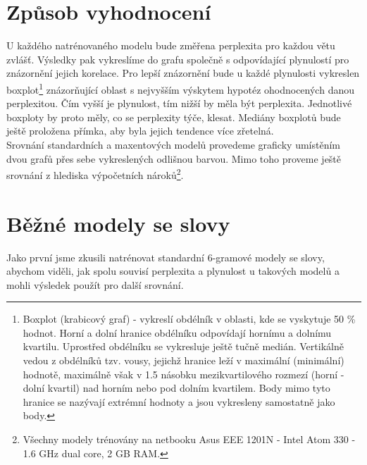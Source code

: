 \documentclass[12pt,a4paper]{report}
\begin{document}
\section{Způsob vyhodnocení}
U každého natrénovaného modelu bude změřena perplexita pro každou větu zvlášť. Výsledky pak vykreslíme do grafu společně s odpovídající plynulostí pro znázornění jejich korelace. Pro lepší znázornění bude u každé plynulosti vykreslen boxplot\footnote{Boxplot (krabicový graf) - vykreslí obdélník v oblasti, kde se vyskytuje 50 \% hodnot. Horní a dolní hranice obdélníku odpovídají hornímu a dolnímu kvartilu. Uprostřed obdélníku se vykresluje ještě tučně medián. Vertikálně vedou z obdélníků tzv. vousy, jejichž hranice leží v maximální (minimální) hodnotě, maximálně však v 1.5 násobku mezikvartilového rozmezí (horní - dolní kvartil) nad horním nebo pod dolním kvartilem. Body mimo tyto hranice se nazývají extrémní hodnoty a jsou vykresleny samostatně jako body.} znázorňující oblast s nejvyšším výskytem hypotéz ohodnocených danou perplexitou. Čím vyšší je plynulost, tím nižší by měla být perplexita. Jednotlivé boxploty by proto měly, co se perplexity týče, klesat. Mediány boxplotů bude ještě proložena přímka, aby byla jejich tendence více zřetelná. \\

Srovnání standardních a maxentových modelů provedeme graficky umístěním dvou grafů přes sebe vykreslených odlišnou barvou. Mimo toho proveme ještě srovnání z hlediska výpočetních nároků\footnote{Všechny modely trénovány na netbooku Asus EEE 1201N - Intel Atom 330 - 1.6 GHz dual core, 2 GB RAM.}.

\section{Běžné modely se slovy}
Jako první jsme zkusili natrénovat standardní 6-gramové modely se slovy, abychom viděli, jak spolu souvisí perplexita a plynulost u takových modelů a mohli výsledek použít pro další srovnání.
\end{document}
